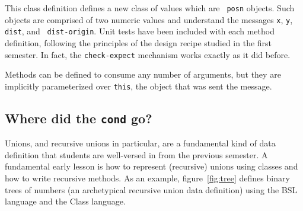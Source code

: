 \documentclass[submission,copyright]{eptcs}
\begin{document}
This class definition defines a new class of values which are {\tt
  posn} objects.  Such objects are comprised of two numeric values
and understand the messages {\tt x}, {\tt y}, {\tt dist}, and {\tt
  dist-origin}.  Unit tests have been included with each method
definition, following the principles of the design recipe studied in
the first semester.  In fact, the {\tt check-expect} mechanism works
exactly as it did before.

Methods can be defined to consume any number of arguments, but they
are implicitly parameterized over {\tt this}, the object that was sent
the message.

\subsection{Where did the {\tt cond} go?}

Unions, and recursive unions in particular, are a fundamental kind of
data definition that students are well-versed in from the previous
semester.  A fundamental early lesson is how to represent (recursive)
unions using classes and how to write recursive methods.  As an
example, figure~\ref{fig:tree} defines binary trees of numbers
(an archetypical recursive union data definition)
using the BSL language and the Class language.


\end{document}
